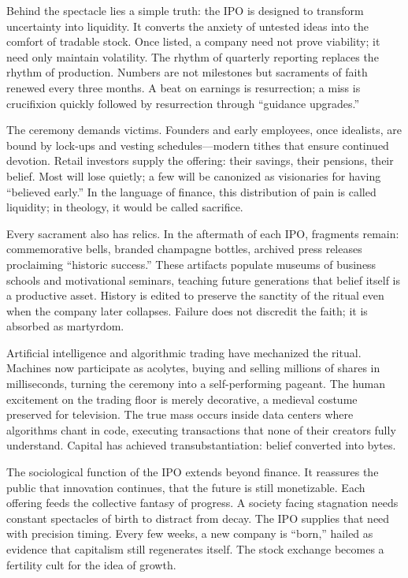 \documentclass[11pt,twoside]{book}
\begin{document}
Behind the spectacle lies a simple truth: the IPO is designed to transform uncertainty into liquidity.  It converts the anxiety of untested ideas into the comfort of tradable stock.  Once listed, a company need not prove viability; it need only maintain volatility.  The rhythm of quarterly reporting replaces the rhythm of production.  Numbers are not milestones but sacraments of faith renewed every three months.  A beat on earnings is resurrection; a miss is crucifixion quickly followed by resurrection through “guidance upgrades.”

The ceremony demands victims.  Founders and early employees, once idealists, are bound by lock-ups and vesting schedules—modern tithes that ensure continued devotion.  Retail investors supply the offering: their savings, their pensions, their belief.  Most will lose quietly; a few will be canonized as visionaries for having “believed early.”  In the language of finance, this distribution of pain is called liquidity; in theology, it would be called sacrifice.

Every sacrament also has relics.  In the aftermath of each IPO, fragments remain: commemorative bells, branded champagne bottles, archived press releases proclaiming “historic success.”  These artifacts populate museums of business schools and motivational seminars, teaching future generations that belief itself is a productive asset.  History is edited to preserve the sanctity of the ritual even when the company later collapses.  Failure does not discredit the faith; it is absorbed as martyrdom.

Artificial intelligence and algorithmic trading have mechanized the ritual.  Machines now participate as acolytes, buying and selling millions of shares in milliseconds, turning the ceremony into a self-performing pageant.  The human excitement on the trading floor is merely decorative, a medieval costume preserved for television.  The true mass occurs inside data centers where algorithms chant in code, executing transactions that none of their creators fully understand.  Capital has achieved transubstantiation: belief converted into bytes.

The sociological function of the IPO extends beyond finance.  It reassures the public that innovation continues, that the future is still monetizable.  Each offering feeds the collective fantasy of progress.  A society facing stagnation needs constant spectacles of birth to distract from decay.  The IPO supplies that need with precision timing.  Every few weeks, a new company is “born,” hailed as evidence that capitalism still regenerates itself.  The stock exchange becomes a fertility cult for the idea of growth.
\end{document}
